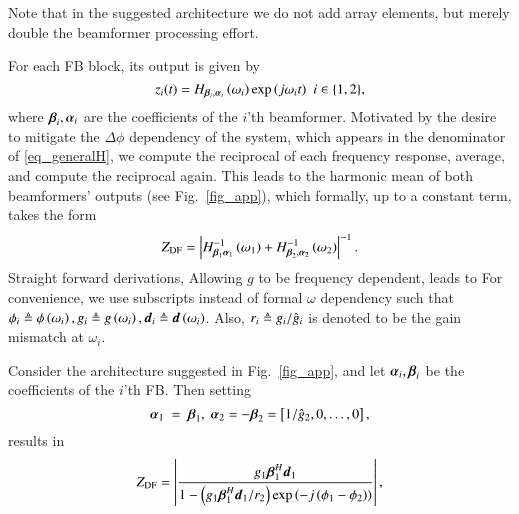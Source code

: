 Note that in the suggested architecture we do not add array elements, but merely double the beamformer processing effort. 
\par For each FB block, its output is given by
\[
z_{i}(t)=H_{\vBetaI{i},\vAlphaI{i}}\rBrace{\omega_{i}}\exp{\rBrace{j\omega_{i}t}}\ \ {i\in\cBrace{1,2}},
\]
where $\boldsymbol{\beta}_{i},\boldsymbol{\alpha}_{i}$ are the coefficients of the $i$'th beamformer.
Motivated by the desire to mitigate the $\Delta\phi$ dependency of the system, which appears in the denominator of \eqref{eq_generalH}, we compute the reciprocal of each frequency response, average, and compute the reciprocal again. This leads to the harmonic mean of both beamformers' outputs (see Fig.~\ref{fig_app}), which formally, up to a constant term, takes the form
\begin{equation}
    \label{eqn_HDF_def}
    Z_{\text{DF}} = \abs{H^{-1}_{\vBetaI{1}\vAlphaI{1}}\rBrace{\omega_{1}}+H^{-1}_{\vBetaI{2},\vAlphaI{2}}\rBrace{\omega_{2}}}^{-1}.
\end{equation}
\ifdefined\useOmega
Straight forward derivations, Allowing $g$ to be frequency dependent, leads to
\else
For convenience, we use subscripts instead of formal $\omega$ dependency such that $\phi_{i}\triangleq\phi\left({\omega_{i}}\right), g_{i}\triangleq{}g\left({\omega_{i}}\right), \boldsymbol{d}_{i}\triangleq\boldsymbol{d}\left({\omega_{i}}\right)$.
Also, $r_i\triangleq{}g_{i}/\hat{g}_{i}$ is denoted to be the gain mismatch at $\omega_i$.


\begin{theorem}
\label{thrm_DF}
Consider the architecture suggested in Fig.~\ref{fig_app}, and let \textit{$\boldsymbol{\alpha}_{i},\boldsymbol{\beta}_{i}$} be the coefficients of the $i$'th FB. Then setting 
\begin{equation}\label{eqn_simpleBeta}
    \vAlphaI{1}~=~\vBetaI{1},\ \vAlphaI{2}=-\vBetaI{2}=\vBrace{1/\gIHat{2},0,\hdots,0},
\end{equation}
results in 
\begin{equation}
    Z_{\text{DF}} = \lBrace{\frac{\gI{1}\vBetaHI{1}\vdI{1}}{1-
    \rBrace{\gI{1}\vBetaHI{1}\vdI{1}/r_{2}}\exp\rBrace{-j\rBrace{\phiI{1}-\phiI{2}}}
    }},
    \label{eqn_H_DF_general}
\end{equation}
\end{theorem}

